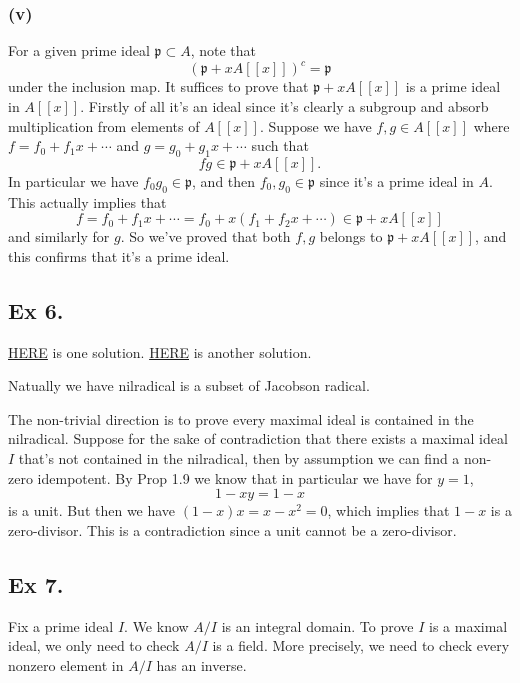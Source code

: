 \subsubsection{(v)} 

For a given prime ideal $\mathfrak p\subset A$, note that 
$$(\mathfrak p+xA[[x]])^c=\mathfrak p$$ under the inclusion map. It suffices to prove that $\mathfrak p+xA[[x]]$ is a prime ideal in $A[[x]]$. Firstly of all it's an ideal since it's clearly a subgroup and absorb multiplication from elements of $A[[x]]$. Suppose we have $f,g\in A[[x]]$ where $f=f_0+f_1x+\cdots$ and $g=g_0+g_1x+\cdots$ such that 
$$fg\in \mathfrak p+xA[[x]].$$
In particular we have $f_0g_0\in \mathfrak p$, and then $f_0,g_0\in \mathfrak p$ since it's a prime ideal in $A$. This actually implies that 
$$f=f_0+f_1x+\cdots=f_0+x(f_1+f_2x+\cdots)\in \mathfrak p+xA[[x]]$$ and similarly for $g$. So we've proved that both $f,g$ belongs to $\mathfrak p+xA[[x]]$, and this confirms that it's a prime ideal.



\subsection{Ex 6.}

\href{https://math.stackexchange.com/questions/2816529/check-my-proof-that-the-nilradical-and-the-jacobson-radical-are-equal-am-1-6}{HERE} is one solution. \href{https://math.stackexchange.com/questions/925332/atiyah-macdonald-problem-6-of-chapter-1  }{HERE} is another solution.

Natually we have nilradical is a subset of Jacobson radical.

The non-trivial direction is to prove every maximal ideal is contained in the nilradical. Suppose for the sake of contradiction that there exists a maximal ideal $I$ that's not contained in the nilradical, then by assumption we can find a non-zero idempotent.
By Prop 1.9 we know that in particular we 
have for $y=1$,
$$1-xy=1-x$$ is a unit. But then we have $(1-x)x=x-x^2=0$, which implies that $1-x$ is a zero-divisor. This is a contradiction since a unit cannot be a zero-divisor. \



\subsection{Ex 7.}\label{Chap 1 Ex 7.}

Fix a prime ideal $I$.
We know $A/I$ is an integral domain. To prove $I$ is a maximal ideal, we only need to check $A/I$ is a field. More precisely, we need to check every nonzero element in $A/I$ has an inverse.\\

